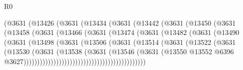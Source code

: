 \begin{lexlean}{R0}
\begin{coremodule}
                          (@3631
                            (@13426
                              (@3631
                                (@13434
                                  (@3631
                                    (@13442
                                      (@3631
                                        (@13450
                                          (@3631
                                            (@13458
                                              (@3631
                                                (@13466
                                                  (@3631
                                                    (@13474
                                                      (@3631
                                                        (@13482
                                                          (@3631
                                                            (@13490
                                                              (@3631
                                                                (@13498
                                                                  (@3631
                                                                    (@13506
                                                                      (@3631
                                                                        (@13514
                                                                          (@3631
                                                                            (@13522
                                                                              (@3631
                                                                                (@13530
                                                                                  (@3631
                                                                                    (@13538
                                                                                      (@3631
                                                                                        (@13546
                                                                                          (@3631
                                                                                            (@13550
                                                                                              @13552
                                                                                              @6396
                                                                                              @3627)))))))))))))))))))))))))))))))))))))))))))))

\end{coremodule}
\end{lexlean}
